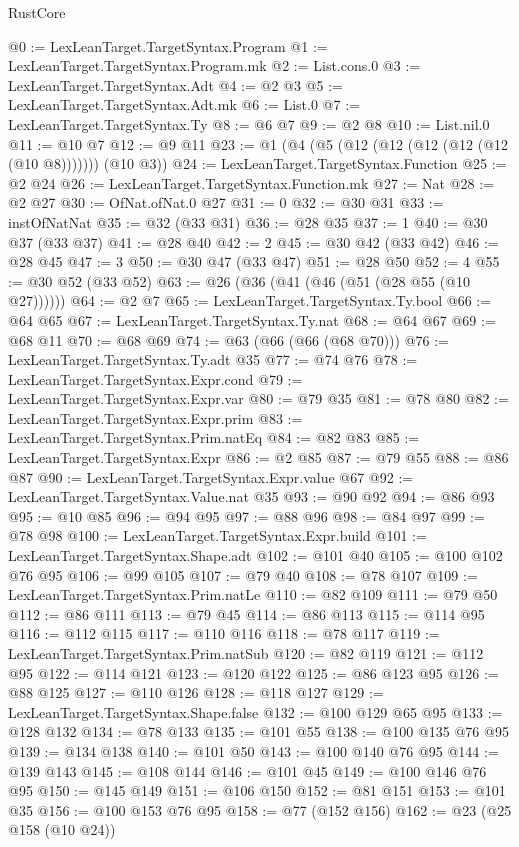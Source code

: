 \begin{lexlean}{RustCore}
\begin{coremodule}
@0 := LexLeanTarget.TargetSyntax.Program
@1 := LexLeanTarget.TargetSyntax.Program.mk
@2 := List.cons.{0}
@3 := LexLeanTarget.TargetSyntax.Adt
@4 := @2 @3
@5 := LexLeanTarget.TargetSyntax.Adt.mk
@6 := List.{0}
@7 := LexLeanTarget.TargetSyntax.Ty
@8 := @6 @7
@9 := @2 @8
@10 := List.nil.{0}
@11 := @10 @7
@12 := @9 @11
@23 := @1 (@4 (@5 (@12 (@12 (@12 (@12 (@12 (@10 @8))))))) (@10 @3))
@24 := LexLeanTarget.TargetSyntax.Function
@25 := @2 @24
@26 := LexLeanTarget.TargetSyntax.Function.mk
@27 := Nat
@28 := @2 @27
@30 := OfNat.ofNat.{0} @27
@31 := 0
@32 := @30 @31
@33 := instOfNatNat
@35 := @32 (@33 @31)
@36 := @28 @35
@37 := 1
@40 := @30 @37 (@33 @37)
@41 := @28 @40
@42 := 2
@45 := @30 @42 (@33 @42)
@46 := @28 @45
@47 := 3
@50 := @30 @47 (@33 @47)
@51 := @28 @50
@52 := 4
@55 := @30 @52 (@33 @52)
@63 := @26 (@36 (@41 (@46 (@51 (@28 @55 (@10 @27))))))
@64 := @2 @7
@65 := LexLeanTarget.TargetSyntax.Ty.bool
@66 := @64 @65
@67 := LexLeanTarget.TargetSyntax.Ty.nat
@68 := @64 @67
@69 := @68 @11
@70 := @68 @69
@74 := @63 (@66 (@66 (@68 @70)))
@76 := LexLeanTarget.TargetSyntax.Ty.adt @35
@77 := @74 @76
@78 := LexLeanTarget.TargetSyntax.Expr.cond
@79 := LexLeanTarget.TargetSyntax.Expr.var
@80 := @79 @35
@81 := @78 @80
@82 := LexLeanTarget.TargetSyntax.Expr.prim
@83 := LexLeanTarget.TargetSyntax.Prim.natEq
@84 := @82 @83
@85 := LexLeanTarget.TargetSyntax.Expr
@86 := @2 @85
@87 := @79 @55
@88 := @86 @87
@90 := LexLeanTarget.TargetSyntax.Expr.value @67
@92 := LexLeanTarget.TargetSyntax.Value.nat @35
@93 := @90 @92
@94 := @86 @93
@95 := @10 @85
@96 := @94 @95
@97 := @88 @96
@98 := @84 @97
@99 := @78 @98
@100 := LexLeanTarget.TargetSyntax.Expr.build
@101 := LexLeanTarget.TargetSyntax.Shape.adt
@102 := @101 @40
@105 := @100 @102 @76 @95
@106 := @99 @105
@107 := @79 @40
@108 := @78 @107
@109 := LexLeanTarget.TargetSyntax.Prim.natLe
@110 := @82 @109
@111 := @79 @50
@112 := @86 @111
@113 := @79 @45
@114 := @86 @113
@115 := @114 @95
@116 := @112 @115
@117 := @110 @116
@118 := @78 @117
@119 := LexLeanTarget.TargetSyntax.Prim.natSub
@120 := @82 @119
@121 := @112 @95
@122 := @114 @121
@123 := @120 @122
@125 := @86 @123 @95
@126 := @88 @125
@127 := @110 @126
@128 := @118 @127
@129 := LexLeanTarget.TargetSyntax.Shape.false
@132 := @100 @129 @65 @95
@133 := @128 @132
@134 := @78 @133
@135 := @101 @55
@138 := @100 @135 @76 @95
@139 := @134 @138
@140 := @101 @50
@143 := @100 @140 @76 @95
@144 := @139 @143
@145 := @108 @144
@146 := @101 @45
@149 := @100 @146 @76 @95
@150 := @145 @149
@151 := @106 @150
@152 := @81 @151
@153 := @101 @35
@156 := @100 @153 @76 @95
@158 := @77 (@152 @156)
@162 := @23 (@25 @158 (@10 @24))

\end{coremodule}
\end{lexlean}
